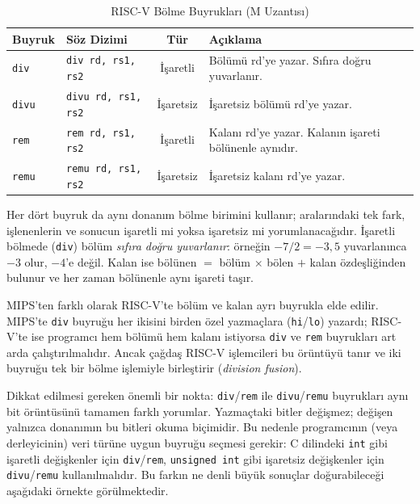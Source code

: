 \begin{table}[htbp]
\centering
\caption{RISC-V Bölme Buyrukları (M Uzantısı)}
\label{tab:bolme-buyruklar}
\small
\begin{tabularx}{\textwidth}{l l c X}
\toprule
\textbf{Buyruk} & \textbf{Söz Dizimi} & \textbf{Tür} & \textbf{Açıklama} \\
\midrule
\texttt{div} & \texttt{div rd, rs1, rs2} & İşaretli & Bölümü rd'ye yazar. Sıfıra doğru yuvarlanır. \\
\texttt{divu} & \texttt{divu rd, rs1, rs2} & İşaretsiz & İşaretsiz bölümü rd'ye yazar. \\
\texttt{rem} & \texttt{rem rd, rs1, rs2} & İşaretli & Kalanı rd'ye yazar. Kalanın işareti bölünenle aynıdır. \\
\texttt{remu} & \texttt{remu rd, rs1, rs2} & İşaretsiz & İşaretsiz kalanı rd'ye yazar. \\
\bottomrule
\end{tabularx}
\end{table}

Her dört buyruk da aynı donanım bölme birimini kullanır; aralarındaki tek fark, işlenenlerin ve sonucun işaretli mi yoksa işaretsiz mi yorumlanacağıdır. İşaretli bölmede (\texttt{div}) bölüm \emph{sıfıra doğru yuvarlanır}: örneğin $-7 / 2 = -3{,}5$ yuvarlanınca $-3$ olur, $-4$'e değil. Kalan ise bölünen $=$ bölüm $\times$ bölen $+$ kalan özdeşliğinden bulunur ve her zaman bölünenle aynı işareti taşır.

MIPS'ten farklı olarak RISC-V'te bölüm ve kalan ayrı buyrukla elde edilir. MIPS'te \texttt{div} buyruğu her ikisini birden özel yazmaçlara (\texttt{hi}/\texttt{lo}) yazardı; RISC-V'te ise programcı hem bölümü hem kalanı istiyorsa \texttt{div} ve \texttt{rem} buyrukları art arda çalıştırılmalıdır. Ancak çağdaş RISC-V işlemcileri bu örüntüyü tanır ve iki buyruğu tek bir bölme işlemiyle birleştirir (\emph{division fusion}).

Dikkat edilmesi gereken önemli bir nokta: \texttt{div}/\texttt{rem} ile \texttt{divu}/\texttt{remu} buyrukları aynı bit örüntüsünü tamamen farklı yorumlar. Yazmaçtaki bitler değişmez; değişen yalnızca donanımın bu bitleri okuma biçimidir. Bu nedenle programcının (veya derleyicinin) veri türüne uygun buyruğu seçmesi gerekir: C dilindeki \texttt{int} gibi işaretli değişkenler için \texttt{div}/\texttt{rem}, \texttt{unsigned int} gibi işaretsiz değişkenler için \texttt{divu}/\texttt{remu} kullanılmalıdır. Bu farkın ne denli büyük sonuçlar doğurabileceği aşağıdaki örnekte görülmektedir.

